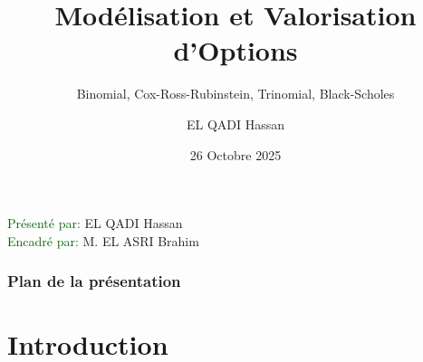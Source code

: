 \documentclass[aspectratio=169, 10pt]{beamer}
\title[Modélisation et Valorisation d'Options]{Modélisation et Valorisation d'Options}
\subtitle{Binomial, Cox-Ross-Rubinstein, Trinomial, Black-Scholes}
\date{26 Octobre 2025}
\author{EL QADI Hassan}
\institute{École Nationale des Sciences Appliquées d'Agadir}
\begin{document}
\begin{frame}[plain]
    \titlepage
    \begin{center}
      {\normalsize\textcolor{darkGreen}{Présenté par: }}
    EL QADI Hassan\\[0.2cm]
     {\normalsize\textcolor{darkGreen}{Encadré par: }}
    M. EL ASRI Brahim
    \end{center} 
   
\end{frame}

\begin{frame}[t]
    \frametitle{Plan de la présentation}
    \tableofcontents
\end{frame}

\section{Introduction}
\end{document}
